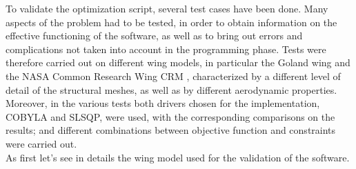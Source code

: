 To validate the optimization script, several test cases have been done.
Many aspects of the problem had to be tested, in order to obtain information on the effective functioning of the software, as well as to bring out errors and complications not taken into account in the programming phase. Tests were therefore carried out on different wing models, in particular the Goland wing and the NASA Common Research Wing CRM , characterized by a different  level of detail of the structural meshes, as well as by different aerodynamic properties. Moreover, in the various tests both drivers chosen for the implementation, COBYLA and SLSQP, were used, with the corresponding comparisons on the results; and different combinations between objective function and constraints were carried out. \\
As first let's see in details the wing model used for the validation of the software.
